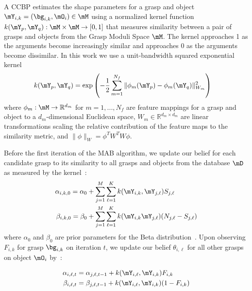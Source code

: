A CCBP estimates the shape parameters for a grasp and object $\mY_{i,k} = (\bg_{i,k}, \mO_{i}) \in \mM$ using a normalized kernel function $k(\mY_p, \mY_q) : \mM \times \mM \rightarrow [0,1]$ that measures similarity between a pair of grasps and objects from the Grasp Moduli Space $\mM$.
The kernel approaches 1 as the arguments become increasingly similar and approaches 0 as the arguments become dissimilar.
In this work we use a unit-bandwidth squared exponential kernel 
\begin{align*}
	k(\mY_p, \mY_q) &= \exp\left( - \frac{1}{2} \sum \limits_{m=1}^{N_f} \|\phi_m(\mY_p) - \phi_m(\mY_q)\|_{W_m}^2 \right)
\end{align*}
\noindent where $\phi_m: \mM \rightarrow \mathbb{R}^{d_m}$ for $m = 1, ..., N_f$ are feature mappings for a grasp and object to a $d_m$-dimensional Euclidean space, $W_m \in \mathbb{R}^{d_m \times d_m}$ are linear transformations scaling the relative contribution of the feature maps to the similarity metric, and $\| \phi \|_{W} = \phi^T W^T W \phi$.

Before the first iteration of the MAB algorithm, we update our belief for each candidate grasp to its similarity to all grasps and objects from the database $\mD$ as measured by the kernel~\cite{goetschalckx2011continuous}:
\begin{align}
	\alpha_{i,k,0} = \alpha_{0} & + \sum \limits_{j=1}^M \sum \limits_{\ell=1}^K k(\mY_{i,k}, \mY_{j,\ell}) S_{j,\ell} \label{eq:alpha-prior} \\
	\beta_{i,k,0} = \beta_{0} & + \sum \limits_{j=1}^M \sum \limits_{\ell=1}^K  k(\mY_{i,k} \mY_{j,\ell}) (N_{j,\ell} - S_{j,\ell}) \label{eq:beta-prior}
\end{align}
\noindent where $\alpha_{0}$ and $\beta_{0}$ are prior parameters for the Beta distribution~\cite{laskey2015bandits}.
Upon observing $F_{i,k}$ for grasp $\bg_{i,k}$ on iteration $t$, we update our belief $\theta_{i, \ell}$ for all other grasps on object $\mO_i$ by~\cite{goetschalckx2011continuous}:

\vspace{-2ex}
\begin{align}
	\alpha_{i,\ell,t} &= \alpha_{j,\ell,t-1} + k(\mY_{i, \ell}, \mY_{i,k}) F_{i,k} \label{eq:alpha} \\
	\beta_{i,\ell,t} &= \beta_{j,\ell,t-1} + k(\mY_{i,\ell}, \mY_{i,k}) (1 - F_{i,k})\label{eq:beta}
\end{align}

